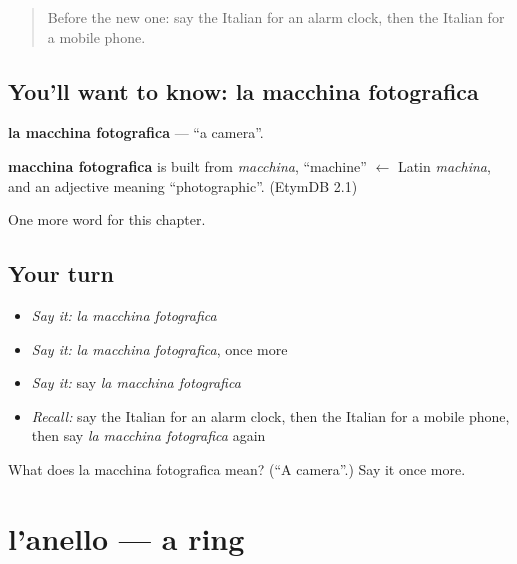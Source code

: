 \label{lesson:IT-C100-macchina-fotografica}



\begin{quote}
Before the new one: say the Italian for an alarm clock, then the Italian for a mobile phone.
\end{quote}

\subsection*{You'll want to know: la macchina fotografica}
\textbf{la macchina fotografica} — \textquotedblleft{}a camera\textquotedblright{}.

\begin{cousinweb}
\textbf{macchina fotografica} is built from \emph{macchina}, \textquotedblleft{}machine\textquotedblright{} $\leftarrow$ Latin \emph{machina}, and an adjective meaning \textquotedblleft{}photographic\textquotedblright{}. (EtymDB 2.1)
\end{cousinweb}

\begin{grammarlens}[title={What you've built}]
One more word for this chapter.
\end{grammarlens}

\subsection*{Your turn}
\begin{itemize}
\raggedright
  \item \emph{Say it:} \emph{la macchina fotografica}
  \item \emph{Say it:} \emph{la macchina fotografica}, once more
  \item \emph{Say it:} say \emph{la macchina fotografica}
  \item \emph{Recall:} say the Italian for an alarm clock, then the Italian for a mobile phone, then say \emph{la macchina fotografica} again
\end{itemize}

\begin{tcolorbox}[breakable,colback=teal!4,colframe=teal!35!black,title={Before you move on}]
What does la macchina fotografica mean? (\textquotedblleft{}A camera\textquotedblright{}.) Say it once more.
\end{tcolorbox}
\section[l'anello]{l'anello — a ring}

